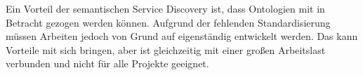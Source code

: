 Ein Vorteil der semantischen Service Discovery ist, dass Ontologien mit in Betracht gezogen werden können.
Aufgrund der fehlenden Standardisierung müssen Arbeiten jedoch von Grund auf eigenständig entwickelt werden.
Das kann Vorteile mit sich bringen, aber ist gleichzeitig mit einer großen Arbeitslast verbunden und nicht für alle Projekte geeignet.
